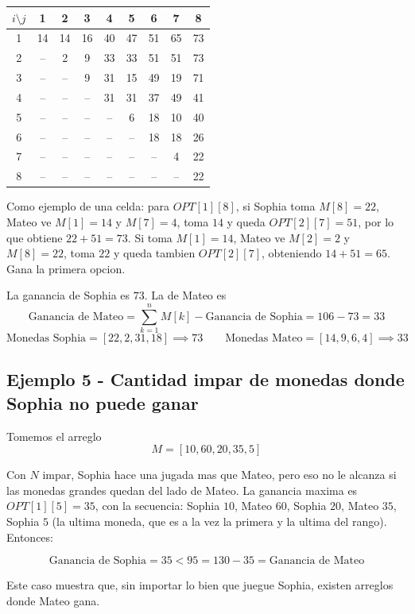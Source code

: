 \begin{table}[H]
\centering
\begin{tabular}{ccccccccc}
\toprule
$i \setminus j$ & 1 & 2 & 3 & 4 & 5 & 6 & 7 & 8 \\
\midrule
1 & 14 & 14 & 16 & 40 & 47 & 51 & 65 & 73 \\
2 & -- & 2  & 9  & 33 & 33 & 51 & 51 & 73 \\
3 & -- & -- & 9  & 31 & 15 & 49 & 19 & 71 \\
4 & -- & -- & -- & 31 & 31 & 37 & 49 & 41 \\
5 & -- & -- & -- & -- & 6  & 18 & 10 & 40 \\
6 & -- & -- & -- & -- & -- & 18 & 18 & 26 \\
7 & -- & -- & -- & -- & -- & -- & 4  & 22 \\
8 & -- & -- & -- & -- & -- & -- & -- & 22 \\
\bottomrule
\end{tabular}
\end{table}
 
Como ejemplo de una celda: para $OPT[1][8]$, si Sophia toma $M[8]=22$, Mateo ve $M[1]=14$ y $M[7]=4$, toma $14$ y queda $OPT[2][7] = 51$, por lo que obtiene $22 + 51 = 73$. Si toma $M[1]=14$, Mateo ve $M[2]=2$ y $M[8]=22$, toma $22$ y queda tambien $OPT[2][7]$, obteniendo $14 + 51 = 65$. Gana la primera opcion.
 
La ganancia de Sophia es $73$. La de Mateo es
\[
\text{Ganancia de Mateo} = \sum_{k=1}^{n} M[k] - \text{Ganancia de Sophia} = 106 - 73 = 33
\]
\[
\text{Monedas Sophia} = [22, 2, 31, 18] \implies 73
\qquad
\text{Monedas Mateo} = [14, 9, 6, 4] \implies 33
\]
\subsection{Ejemplo 5 - Cantidad impar de monedas donde Sophia no puede ganar}
 
Tomemos el arreglo
\[
M = [10, 60, 20, 35, 5]
\]
 
Con $N$ impar, Sophia hace una jugada mas que Mateo, pero eso no le alcanza si las monedas grandes quedan del lado de Mateo. La ganancia maxima es $OPT[1][5] = 35$, con la secuencia: Sophia $10$, Mateo $60$, Sophia $20$, Mateo $35$, Sophia $5$ (la ultima moneda, que es a la vez la primera y la ultima del rango). Entonces:
 
\[
\text{Ganancia de Sophia} = 35 < 95 = 130 - 35 = \text{Ganancia de Mateo}
\]
 
Este caso muestra que, sin importar lo bien que juegue Sophia, existen arreglos donde Mateo gana.
